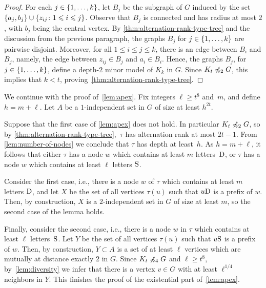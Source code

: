 \begin{proof}
For each $j\in\{1,\ldots,k\}$, let $B_j$
be the subgraph of $G$ induced by the set
$\{a_j,b_j\}\cup\{z_{ij}\colon 1\leqslant i\leqslant  j\}$.
Observe that $B_j$ is connected and has radius at most $2$, with $b_j$ being the central vertex.
By \cref{thm:alternation-rank-type-tree} and the discussion from the previous paragraph, the graphs $B_j$ for $j\in \{1,\ldots,k\}$
are pairwise disjoint.
Moreover, for all $1\le i\le j\le k$, there is an edge between $B_i$
and $B_j$, namely, the edge between $z_{ij}\in B_j$
and $a_i\in B_i$.
Hence, the graphs $B_j$, for $j\in \{1,\ldots,k\}$, define a depth-$2$ minor model of $K_k$ in $G$. Since $K_t\not\preccurlyeq_{2}G$, this implies that $k<t$, proving~\cref{thm:alternation-rank-type-tree}.
\end{proof}

We continue with the proof of~\cref{lem:apex}. 
Fix integers $\ell\ge t^8$ and~$m$, and define $h=m+\ell$.
Let $A$ be a $1$-independent set in $G$
of size at least $h^{2t}$.

Suppose that the first case of \cref{lem:apex} does not hold. In particular $K_t\not\preccurlyeq_2 G$, so by \cref{thm:alternation-rank-type-tree},~$\tau$ has alternation rank at most $2t-1$. From \cref{lem:number-of-nodes} 
we conclude that $\tau$  has depth at least~$h$.
As $h=m+\ell$, it follows that either $\tau$  has a node $w$ which contains at least $m$ letters~$\mathrm{D}$, or $\tau$ has a node $w$ which contains  at least $\ell$ letters $\mathrm{S}$.

Consider the first case, i.e., there is a node $w$ of $\tau$
which contains at least $m$ letters $\mathrm{D}$, and let $X$
be the set of all vertices $\tau(u)$ such that $u\mathrm{D}$ is a prefix of $w$. Then, by construction, $X$ is a $2$-independent set in $G$ of size at least $m$, so the second case of the lemma holds.

Finally, consider the second case, i.e., there is a node $w$ in $\tau$ which contains at least $\ell$ letters~$\mathrm{S}$. Let 
$Y$ be the set of all vertices $\tau(u)$ such that $u\mathrm{S}$ is a prefix of $w$. Then, by construction, $Y\subset A$ is a set of at least $\ell$ vertices which are mutually at distance exactly $2$ in $G$. 
Since $K_t\not\preccurlyeq_4 G$ and $\ell\geq t^8$, by~\cref{lem:diversity} we infer that there is a vertex $v\in G$
with at least $\ell^{1/4}$ neighbors in $Y$.
This finishes the proof of the existential part of~\cref{lem:apex}.

